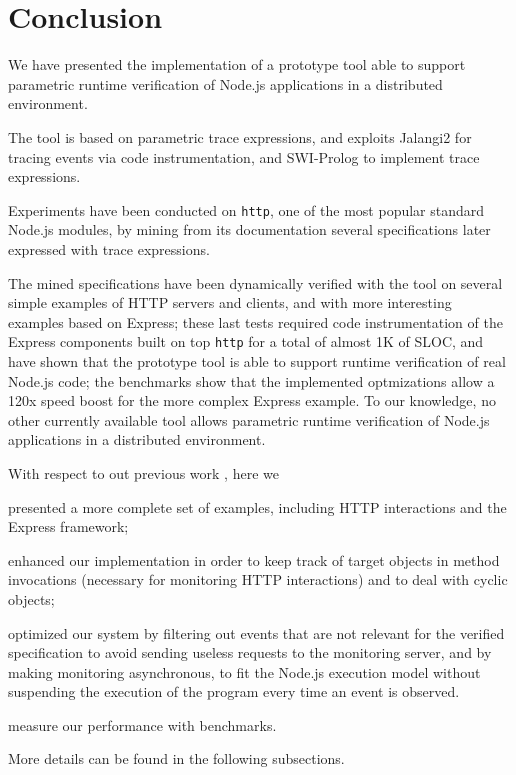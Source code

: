 \section{Conclusion}
\label{sec:conclu}

We have presented the implementation of a prototype tool able to support
parametric runtime verification of Node.js applications in a distributed environment.

The tool is based on parametric trace expressions, and exploits Jalangi2 for tracing events via code instrumentation, and SWI-Prolog to
implement trace expressions.

Experiments have been conducted on \lstinline{http}, one of the most popular standard Node.js modules,
by mining from its documentation several specifications later expressed with trace expressions.

The mined specifications have been dynamically verified with the tool on several simple examples of HTTP servers and clients,
and with more interesting examples based on Express; these last tests required code instrumentation of the Express components
built on top \lstinline{http} for a total of almost 1K of SLOC, and have shown that the prototype tool is able to support
runtime verification of real Node.js code; the benchmarks show that the implemented optmizations allow a 120x speed boost for the more
complex Express example.
To our knowledge, no other currently available tool allows parametric runtime verification of Node.js applications in a distributed environment.

With respect to out previous work \cite{TowardsIoT17}, here we
\begin{enumerate*}[label=(\alph*)]
	\item presented a more complete set of examples, including HTTP interactions and the Express framework;
	\item enhanced our implementation in order to keep track of target objects in method invocations (necessary for monitoring HTTP interactions) and to deal with cyclic objects;
	\item optimized our system by filtering out events that are not relevant for the verified specification to avoid sending useless requests to the monitoring server, and by making monitoring asynchronous, to fit the Node.js execution model without suspending the execution of the program every time an event is observed.
	\item measure our performance with benchmarks.
\end{enumerate*}
More details can be found in the following subsections.

